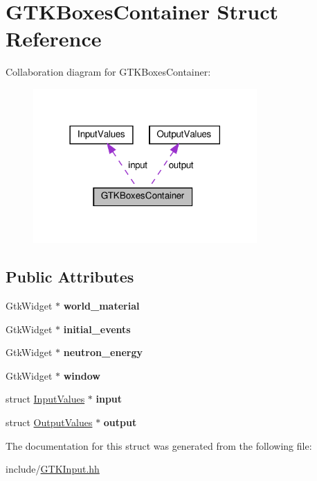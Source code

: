 \hypertarget{structGTKBoxesContainer}{}\section{G\+T\+K\+Boxes\+Container Struct Reference}
\label{structGTKBoxesContainer}


Collaboration diagram for G\+T\+K\+Boxes\+Container\+:
\nopagebreak
\begin{figure}[H]
\begin{center}
\leavevmode
\includegraphics[width=242pt]{structGTKBoxesContainer__coll__graph}
\end{center}
\end{figure}
\subsection*{Public Attributes}
\begin{DoxyCompactItemize}
\item 
\mbox{\label{structGTKBoxesContainer_acbdbbc58bb89072abb323d27d9ba4f9e}} 
Gtk\+Widget $\ast$ {\bfseries world\+\_\+material}
\item 
\mbox{\label{structGTKBoxesContainer_aa5d9a558032880dc9c75da2310eed385}} 
Gtk\+Widget $\ast$ {\bfseries initial\+\_\+events}
\item 
\mbox{\label{structGTKBoxesContainer_ae3293caaf4b63043ce80c225513e10e7}} 
Gtk\+Widget $\ast$ {\bfseries neutron\+\_\+energy}
\item 
\mbox{\label{structGTKBoxesContainer_a56dc6c28ec9242c0668cc2a14e33fc06}} 
Gtk\+Widget $\ast$ {\bfseries window}
\item 
\mbox{\label{structGTKBoxesContainer_af90756c5ab7e0d1f9c9a5e1c328960cb}} 
struct \hyperlink{classInputValues}{Input\+Values} $\ast$ {\bfseries input}
\item 
\mbox{\label{structGTKBoxesContainer_aa60108d0377538098212c3b870b48bf3}} 
struct \hyperlink{classOutputValues}{Output\+Values} $\ast$ {\bfseries output}
\end{DoxyCompactItemize}


The documentation for this struct was generated from the following file\+:\begin{DoxyCompactItemize}
\item 
include/\hyperlink{GTKInput_8hh}{G\+T\+K\+Input.\+hh}\end{DoxyCompactItemize}
